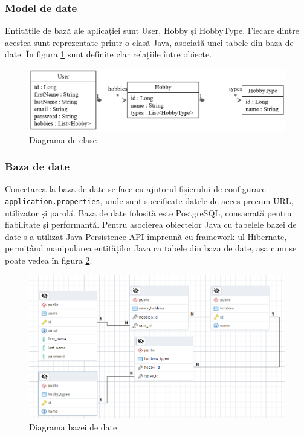 \subsubsection*{Model de date}
Entitățile de bază ale aplicației sunt User, Hobby și HobbyType. Fiecare dintre acestea sunt reprezentate printr-o clasă Java, asociată unei tabele din baza de date.
În figura \ref{FigClassDiagram} sunt definite clar relațiile între obiecte.

\begin{figure}[htbp]
	\centering
    \includegraphics[scale=0.40]{./figures/class-diagram.png}
	\caption{Diagrama de clase}
	\label{FigClassDiagram}
\end{figure}

\subsubsection*{Baza de date}
Conectarea la baza de date se face cu ajutorul fișierului de configurare \texttt{application.properties}, unde sunt specificate datele de acces precum URL, utilizator și parolă. 
Baza de date folosită este PostgreSQL\cite{postgresqldocs}, consacrată pentru fiabilitate și performanță. 
Pentru asocierea obiectelor Java cu tabelele bazei de date s-a utilizat Java Persistence API împreună cu framework-ul Hibernate\cite{hibernatedocs}, permițând manipularea entităților Java ca tabele din baza de date, așa cum se poate vedea în figura \ref{FigDbDiagram}.

\begin{figure}[htbp]
	\centering
    \includegraphics[scale=0.65]{./figures/db-diagram.png}
	\caption{Diagrama bazei de date}
	\label{FigDbDiagram}
\end{figure}

